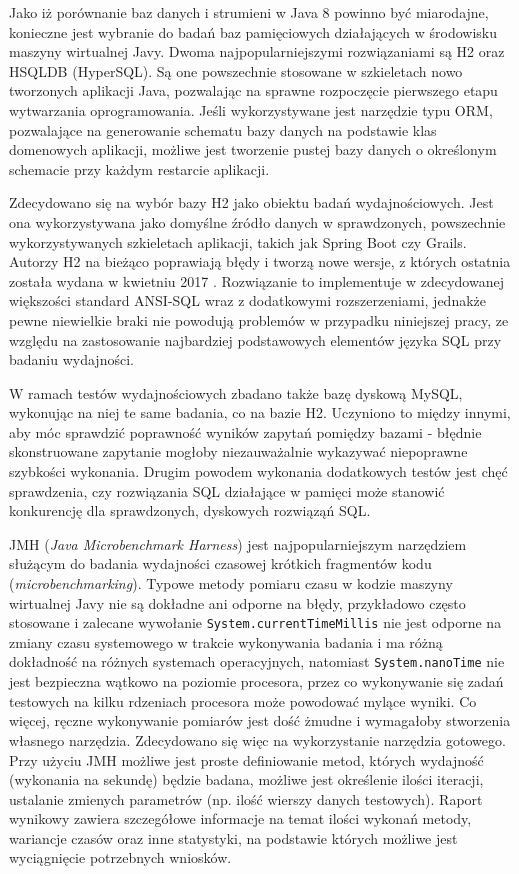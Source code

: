 \documentclass[12pt,twoside,openright]{extarticle}
\begin{document}
    Jako iż porównanie baz danych i strumieni w Java 8 powinno być miarodajne, konieczne jest wybranie do badań baz pamięciowych działających w środowisku maszyny wirtualnej Javy. Dwoma najpopularniejszymi rozwiązaniami są H2 oraz HSQLDB (HyperSQL). Są one powszechnie stosowane w szkieletach nowo tworzonych aplikacji Java, pozwalając na sprawne rozpoczęcie pierwszego etapu wytwarzania oprogramowania. Jeśli wykorzystywane jest narzędzie typu ORM, pozwalające na generowanie schematu bazy danych na podstawie klas domenowych aplikacji, możliwe jest tworzenie pustej bazy danych o określonym schemacie przy każdym restarcie aplikacji. 
    
    Zdecydowano się na wybór bazy H2 jako obiektu badań wydajnościowych. Jest ona wykorzystywana jako domyślne źródło danych w sprawdzonych, powszechnie wykorzystywanych szkieletach aplikacji, takich jak Spring Boot czy Grails. Autorzy H2 na bieżąco poprawiają błędy i tworzą nowe wersje, z których ostatnia została wydana w kwietniu 2017 \cite{h2maven}. Rozwiązanie to implementuje w zdecydowanej większości standard ANSI-SQL wraz z dodatkowymi rozszerzeniami, jednakże pewne niewielkie braki nie powodują problemów w przypadku niniejszej pracy, ze względu na zastosowanie najbardziej podstawowych elementów języka SQL przy badaniu wydajności.

    W ramach testów wydajnościowych zbadano także bazę dyskową MySQL, wykonując na niej te same badania, co na bazie H2. Uczyniono to między innymi, aby móc sprawdzić poprawność wyników zapytań pomiędzy bazami - błędnie skonstruowane zapytanie mogłoby niezauważalnie wykazywać niepoprawne szybkości wykonania. Drugim powodem wykonania dodatkowych testów jest chęć sprawdzenia, czy rozwiązania SQL działające w pamięci może stanowić konkurencję dla sprawdzonych, dyskowych rozwiąząń SQL.

    JMH (\textit{Java Microbenchmark Harness}) jest najpopularniejszym narzędziem służącym do badania wydajności czasowej krótkich fragmentów kodu (\textit{microbenchmarking}). Typowe metody pomiaru czasu w kodzie maszyny wirtualnej Javy nie są dokładne ani odporne na błędy, przykładowo często stosowane i zalecane wywołanie \texttt{System.currentTimeMillis} nie jest odporne na zmiany czasu systemowego w trakcie wykonywania badania i ma różną dokładność na różnych systemach operacyjnych, natomiast \texttt{System.nanoTime} nie jest bezpieczna wątkowo na poziomie procesora, przez co wykonywanie się zadań testowych na kilku rdzeniach procesora może powodować mylące wyniki. Co więcej, ręczne wykonywanie pomiarów jest dość żmudne i wymagałoby stworzenia własnego narzędzia. Zdecydowano się więc na wykorzystanie narzędzia gotowego. Przy użyciu JMH możliwe jest proste definiowanie metod, których wydajność (wykonania na sekundę) będzie badana, możliwe jest określenie ilości iteracji, ustalanie zmienych parametrów (np. ilość wierszy danych testowych). Raport wynikowy zawiera szczegółowe informacje na temat ilości wykonań metody, wariancje czasów oraz inne statystyki, na podstawie których możliwe jest wyciągnięcie potrzebnych wniosków.
\end{document}
